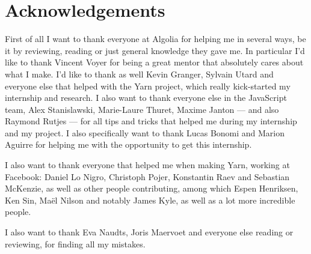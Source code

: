 
\chapter{Acknowledgements}%
\label{chp:acknowledgements}

First of all I want to thank everyone at Algolia for helping me in several ways, be it by reviewing, reading or just general knowledge they gave me. In particular I'd like to thank Vincent Voyer for being a great mentor that absolutely cares about what I make. I'd like to thank as well Kevin Granger, Sylvain Utard and everyone else that helped with the Yarn project, which really kick-started my internship and research. I also want to thank everyone else in the JavaScript team, Alex Stanislawski, Marie-Laure Thuret, Maxime Janton --- and also Raymond Rutjes --- for all tips and tricks that helped me during my internship and my project. I also specifically want to thank Lucas Bonomi and Marion Aguirre for helping me with the opportunity to get this internship.

I also want to thank everyone that helped me when making Yarn, working at Facebook: Daniel Lo Nigro, Christoph Pojer, Konstantin Raev and Sebastian McKenzie, as well as other people contributing, among which Espen Henriksen, Ken Sin, Maël Nilson and notably James Kyle, as well as a lot more incredible people.

I also want to thank Eva Naudts, Joris Maervoet and everyone else reading or reviewing, for finding all my mistakes.
